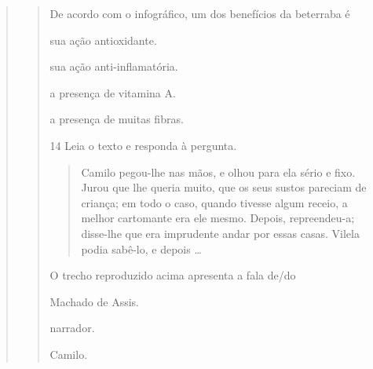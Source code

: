 \begin{escolha}
\begin{escolha}
\begin{escolha}
\begin{quote}
\begin{quote}
{De acordo com o infográfico, um dos benefícios da beterraba é

\begin{escolha}
  \item sua ação antioxidante.

  \item sua ação anti-inflamatória.

  \item a presença de vitamina A.

  \item a presença de muitas fibras.
\end{escolha}


\num{14} Leia o texto e responda à pergunta.

\begin{quote}
Camilo pegou-lhe nas mãos, e olhou para ela sério e fixo. Jurou que lhe
queria muito, que os seus sustos pareciam de criança; em todo o caso,
quando tivesse algum receio, a melhor cartomante era ele mesmo. Depois,
repreendeu-a; disse-lhe que era imprudente andar por essas casas. Vilela
podia sabê-lo, e depois \ldots
\end{quote}


O trecho reproduzido acima apresenta a fala de/do

\begin{escolha}
  \item Machado de Assis.

  \item narrador.

  \item Camilo.


\end{escolha}}
\end{quote}
\end{quote}
\end{escolha}
\end{escolha}
\end{escolha}
